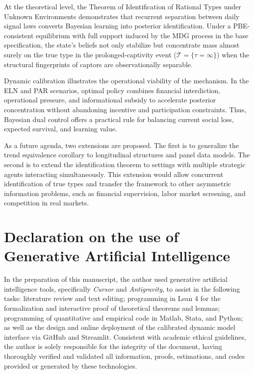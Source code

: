 \documentclass[review,authoryear,12pt]{elsarticle}
\theoremstyle{plain}
\theoremstyle{definition}
\newcommand{\1}{\mathbf{1}}
\begin{document}
At the theoretical level, the Theorem of Identification of Rational Types under Unknown Environments demonstrates that recurrent separation between daily signal laws converts Bayesian learning into posterior identification. Under a PBE-consistent equilibrium with full support induced by the MDG process in the base specification, the state's beliefs not only stabilize but concentrate mass almost surely on the true type in the prolonged-captivity event ($\mathcal{T}=\{\tau=\infty\}$) when the structural fingerprints of captors are observationally separable.

Dynamic calibration illustrates the operational viability of the mechanism. In the ELN and PAR scenarios, optimal policy combines financial interdiction, operational pressure, and informational subsidy to accelerate posterior concentration without abandoning incentive and participation constraints. Thus, Bayesian dual control offers a practical rule for balancing current social loss, expected survival, and learning value.

As a future agenda, two extensions are proposed. The first is to generalize the trend equivalence corollary to longitudinal structures and panel data models. The second is to extend the identification theorem to settings with multiple strategic agents interacting simultaneously. This extension would allow concurrent identification of true types and transfer the framework to other asymmetric information problems, such as financial supervision, labor market screening, and competition in real markets.

\section*{Declaration on the use of Generative Artificial Intelligence}

In the preparation of this manuscript, the author used generative artificial intelligence tools, specifically \emph{Cursor} and \emph{Antigravity}, to assist in the following tasks: literature review and text editing; programming in Lean 4 for the formalization and interactive proof of theoretical theorems and lemmas; programming of quantitative and empirical code in Matlab, Stata, and Python; as well as the design and online deployment of the calibrated dynamic model interface via GitHub and Streamlit. Consistent with academic ethical guidelines, the author is solely responsible for the integrity of the document, having thoroughly verified and validated all information, proofs, estimations, and codes provided or generated by these technologies.




\end{document}
